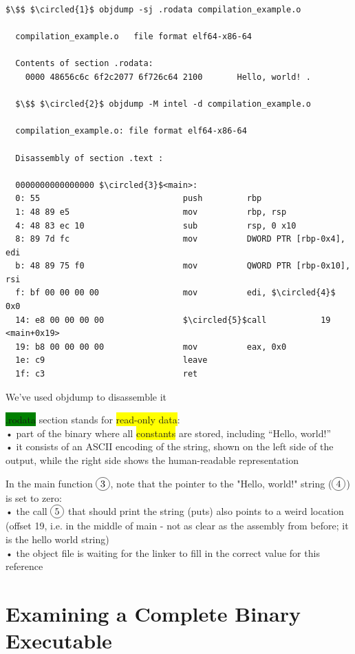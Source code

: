 \documentclass[]{project_plan}
\newcommand*\circled[1]{\tikz[baseline=(char.base)]{
            \node[shape=circle,draw,inner sep=2pt] (char) {#1};}}
\begin{document}
\begin{lstlisting}[mathescape]
  $\$$ $\circled{1}$ objdump -sj .rodata compilation_example.o

  compilation_example.o   file format elf64-x86-64

  Contents of section .rodata:
    0000 48656c6c 6f2c2077 6f726c64 2100       Hello, world! .

  $\$$ $\circled{2}$ objdump -M intel -d compilation_example.o

  compilation_example.o: file format elf64-x86-64

  Disassembly of section .text :

  0000000000000000 $\circled{3}$<main>:
  0: 55                             push         rbp
  1: 48 89 e5                       mov          rbp, rsp
  4: 48 83 ec 10                    sub          rsp, 0 x10
  8: 89 7d fc                       mov          DWORD PTR [rbp-0x4], edi
  b: 48 89 75 f0                    mov          QWORD PTR [rbp-0x10], rsi
  f: bf 00 00 00 00                 mov          edi, $\circled{4}$ 0x0
  14: e8 00 00 00 00                $\circled{5}$call           19 <main+0x19>
  19: b8 00 00 00 00                mov          eax, 0x0
  1e: c9                            leave
  1f: c3                            ret
\end{lstlisting}

We’ve used objdump to disassemble it

\colorbox{green}{.rodata} section stands for \colorbox{yellow}{read-only data}:\\
• part of the binary where all \colorbox{yellow}{constants} are stored, including “Hello, world!”\\
• it consists of an ASCII encoding of the string, shown on the left side of the output,
while the right side shows the human-readable representation

In the main function $\circled{3}$, note that the pointer to the "Hello, world!" string ($\circled{4}$) is set to zero:\\
• the call $\circled{5}$ that should print the string (puts) also points to a weird location\\
(offset 19, i.e. in the middle of main - not as clear as the assembly from before; it is the hello world string)\\
• the object file is waiting for the linker to fill in the correct value for this reference

\section{Examining a Complete Binary Executable}
\end{document}
